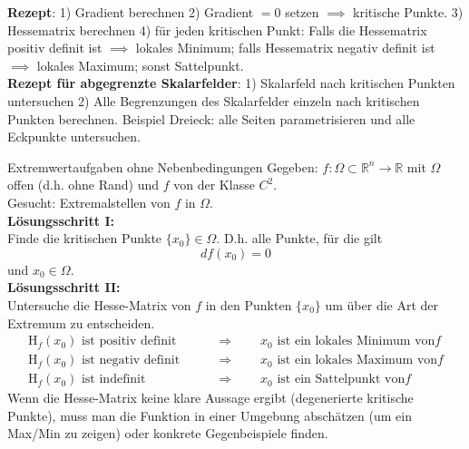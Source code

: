 \textbf{Rezept}: 1) Gradient berechnen 2) Gradient $=0$ setzen $\implies$ kritische Punkte. 3) Hessematrix berechnen 4) für jeden kritischen Punkt: Falls die Hessematrix positiv definit ist $\implies$ lokales Minimum; falls Hessematrix negativ definit ist $\implies$ lokales Maximum; sonst Sattelpunkt.\\

\textbf{Rezept für abgegrenzte Skalarfelder}: 1) Skalarfeld nach kritischen Punkten untersuchen 2) Alle Begrenzungen des Skalarfelder einzeln nach kritischen Punkten berechnen. Beispiel Dreieck: alle Seiten parametrisieren und alle Eckpunkte untersuchen.

\begin{Rezept}[label=R1]{Extremwertaufgaben ohne Nebenbedingungen}{}
	Gegeben: $f:\Omega\subset \mathbb{R}^n \to \mathbb{R}$ mit $\Omega$ offen (d.h. ohne Rand) und $f$ von der Klasse $C^2$.\\
	Gesucht: Extremalstellen von $f$ in $\Omega$.\\
	\newline
	\textbf{Lösungsschritt I:}\\
	Finde die kritischen Punkte $\{x_0\} \in \Omega$. D.h. alle Punkte, für die gilt
	\begin{equation*}
	df(x_0)=0
	\end{equation*}
	und $x_0 \in \Omega$.\\
	\textbf{Lösungsschritt II:}\\
	Untersuche die Hesse-Matrix von $f$ in den Punkten $\{x_0\}$ um über die Art der Extremum zu entscheiden.
	\begin{align*}
	\text{H}_f(x_0) \text{ ist positiv definit} \qquad &\Rightarrow \qquad x_0 \text{ ist ein lokales Minimum von} f\\
	\text{H}_f(x_0) \text{ ist negativ definit} \qquad &\Rightarrow \qquad x_0 \text{ ist ein lokales Maximum von} f\\
	\text{H}_f(x_0) \text{ ist indefinit} \qquad &\Rightarrow \qquad x_0 \text{ ist ein Sattelpunkt von} f
	\end{align*}
	Wenn die Hesse-Matrix keine klare Aussage ergibt (degenerierte kritische Punkte), muss man die Funktion in einer Umgebung abschätzen (um ein Max/Min zu zeigen) oder konkrete Gegenbeispiele finden.
\end{Rezept}

